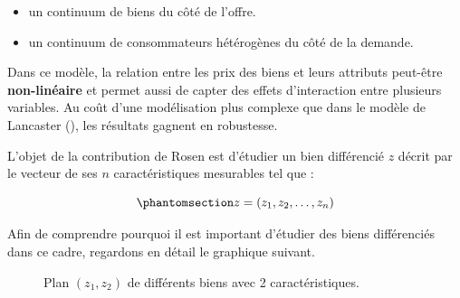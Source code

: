 \documentclass[
  12pt,
]{report}
\begin{document}
\begin{itemize}
\item
  un continuum de biens du côté de l'offre.
\item
  un continuum de consommateurs hétérogènes du côté de la demande.
\end{itemize}

Dans ce modèle, la relation entre les prix des biens et leurs attributs
peut-être \textbf{non-linéaire} et permet aussi de capter des effets
d'interaction entre plusieurs variables. Au coût d'une modélisation plus
complexe que dans le modèle de Lancaster
(), les résultats gagnent en
robustesse.

L'objet de la contribution de Rosen est d'étudier un bien différencié
\(z\) décrit par le vecteur de ses \(n\) caractéristiques mesurables tel
que :

\begin{equation}\phantomsection\label{eq-hedonic}{
z = (z_1, z_2, \dots, z_n)
}\end{equation}

Afin de comprendre pourquoi il est important d'étudier des biens
différenciés dans ce cadre, regardons en détail le graphique suivant.

\begin{figure}


\caption{\label{fig-hedonic}Plan \((z_1, z_2)\) de différents biens avec
2 caractéristiques.}

\end{figure}%
\end{document}
